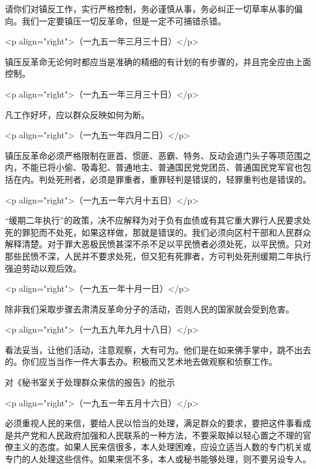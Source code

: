 请你们对镇反工作，实行严格控制，务必谨慎从事，务必纠正一切草率从事的偏向。我们一定要镇压一切反革命，但是一定不可捕错杀错。

<p align="right">（一九五一年三月三十日）</p>

镇压反革命无论何时都应当是准确的精细的有计划的有步骤的，并且完全应由上面控制。

<p align="right">（一九五一年三月三十日）</p>

凡工作好坏，应以群众反映如何为断。

<p align="right">（一九五一年四月二日）</p>

镇压反革命必须严格限制在匪首、惯匪、恶霸、特务、反动会道门头子等项范围之内，不能已将小偷、吸毒犯、普通地主、普通国民党党团员、普通国民党军官也包括在内。判处死刑者，必须是罪重者，重罪轻判是错误的，轻罪重判也是错误的。

<p align="right">（一九五一年六月十五日）</p>

“缓期二年执行”的政策，决不应解释为对于负有血债或有其它重大罪行人民要求处死的罪犯而不处死，如果这样做，那就是错误的。我们必须向区村干部和人民群众解释清楚。对于罪大恶极民愤甚深不杀不足以平民愤者必须处死，以平民愤。只对那些民愤不深，人民并不要求处死，但又犯有死罪者，方可判处死刑缓期二年执行强迫劳动以观后效。

<p align="right">（一九五一年十月一日）</p>

除非我们采取步骤去肃清反革命分子的活动，否则人民的国家就会受到危害。

<p align="right">（一九五九年九月十八日）</p>

看法妥当，让他们活动，注意观察，大有可为。他们是在如来佛手掌中，跳不出去的。你们应当当作一件大事去办。积极而又艺术地去做观察和侦察工作。

对《秘书室关于处理群众来信的报告》的批示

<p align="right">（一九五一年五月十六日）</p>

必须重视人民的来信，要给人民以恰当的处理，满足群众的要求，要把这件事看成是共产党和人民政府加强和人民联系的一种方法，不要采取掉以轻心置之不理的官僚主义的态度。如果人民来信很多，本人处理困难，应设立适当人数的专门机关或专门的人处理这些信件。如果来信不多，本人或秘书能够处理，则不要另设专人。


